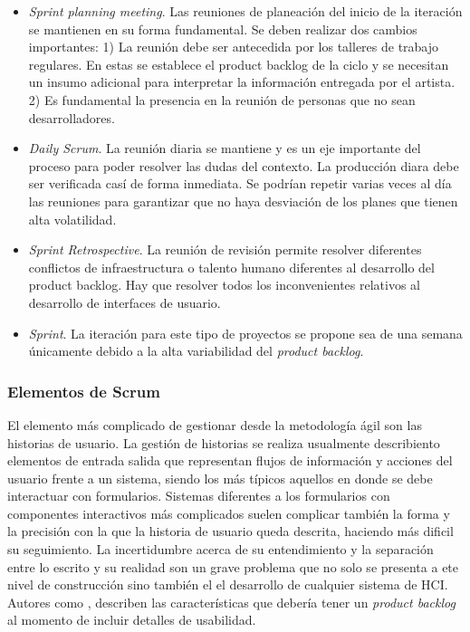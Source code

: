 \begin{itemize}

  \item \textit{Sprint planning meeting}. Las reuniones de planeación del inicio de la iteración se mantienen en su forma fundamental. Se deben realizar dos cambios importantes: 1) La reunión debe ser antecedida por los talleres de trabajo regulares. En estas se establece el product backlog de la ciclo y se necesitan un insumo adicional para interpretar la información entregada por el artista. 2)  Es fundamental la presencia en la reunión de personas que no sean desarrolladores.

  \item \textit{Daily Scrum}. La reunión diaria se mantiene y es un eje importante del proceso para poder resolver las dudas del contexto. La producción diara debe ser verificada casí de forma inmediata. Se podrían repetir varias veces al día las reuniones para garantizar que no haya desviación de los planes que tienen alta volatilidad.

  \item \textit{Sprint Retrospective}. La reunión de revisión permite resolver diferentes conflictos de infraestructura o talento humano diferentes al desarrollo del product backlog. Hay que resolver todos los inconvenientes relativos al desarrollo de interfaces de usuario.

  \item \textit{Sprint}. La iteración para este tipo de proyectos se propone sea de una semana únicamente debido a la alta variabilidad del \textit{product backlog}.

\end{itemize}

\subsubsection{Elementos de Scrum}

El elemento más complicado de gestionar desde la metodología ágil son las historias de usuario. La gestión de historias se realiza usualmente describiento elementos de entrada salida que representan flujos de información y acciones del usuario frente a un sistema, siendo los más típicos aquellos en donde se debe interactuar con formularios. Sistemas diferentes a los formularios con componentes interactivos más complicados suelen complicar también la forma y la precisión con la que la historia de usuario queda descrita, haciendo más dificil su seguimiento. La incertidumbre acerca de su entendimiento y la separación entre lo escrito y su realidad son un grave problema que no solo se presenta a ete nivel de construcción sino también el el desarrollo de cualquier sistema de HCI. Autores como \cite{moreno2012agile}, describen las características que debería tener un \textit{product backlog} al momento de incluir detalles de usabilidad.

